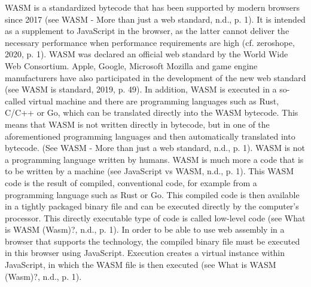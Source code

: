 WASM is a standardized bytecode that has been supported by modern browsers since 2017 (see WASM - More than just a web standard, n.d., p. 1). It is intended as a supplement to JavaScript in the browser, as the latter cannot deliver the necessary performance when performance requirements are high (cf. zeroshope, 2020, p. 1).
WASM was declared an official web standard by the World Wide Web Consortium. Apple, Google, Microsoft Mozilla and game engine manufacturers have also participated in the development of the new web standard (see \dq WASM is standard\dq , 2019, p. 49).
In addition, WASM is executed in a so-called virtual machine and there are programming languages such as Rust, C/C++ or Go, which can be translated directly into the WASM bytecode. This means that WASM is not written directly in bytecode, but in one of the aforementioned programming languages and then automatically translated into bytecode. (See WASM - More than just a web standard, n.d., p. 1).
WASM is not a programming language written by humans. WASM is much more a code that is to be written by a machine (see JavaScript vs WASM, n.d., p. 1). This WASM code is the result of compiled, conventional code, for example from a programming language such as Rust or Go. This compiled code is then available in a tightly packaged binary file and can be executed directly by the computer's processor. This directly executable type of code is called low-level code (see What is WASM (Wasm)?, n.d., p. 1).
In order to be able to use web assembly in a browser that supports the technology, the compiled binary file must be executed in this browser using JavaScript. Execution creates a virtual instance within JavaScript, in which the WASM file is then executed (see What is WASM (Wasm)?, n.d., p. 1).
